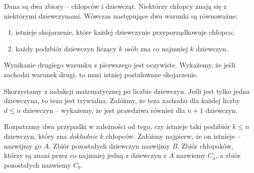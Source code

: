 \newpage


\noindent
Dana są dwa zbiory -- chłopców i dziewcząt. Niektórzy chłopcy znają się z niektórymi dziewczynami. Wówczas następujące dwa warunki są równoważne:
\begin{enumerate}
	\item istnieje skojarzenie, które każdej dziewczynie przyporządkowuje chłopca;
	\item każdy podzbiór dziewczyn liczący $k$ osób zna co najmniej $k$ dziewczyn.
\end{enumerate}



\vspace{5px}
\noindent
Wynikanie drugiego warunku z pierwszego jest oczywiste. Wykażemy, że jeśli zachodzi warunek drugi, to musi istniej postulowane skojarzenie.

\vspace{10px}
\noindent
Skorzystamy z indukcji matematycznej po liczbie dziewczyn. Jeśli jest tylko jedna dziewczyna, to teza jest trywialna. Załóżmy, że teza zachodzi dla każdej liczby $d \leqslant n$ dziewczyn -- wykażemy, że jest prawdziwa również dla $n + 1$ dziewczyn.

\vspace{10px}
\noindent
Rozpatrzmy dwa przypadki w zależności od tego, czy istnieje taki podzbiór $k \leqslant n$ dziewczyn, który zna \textit{dokładnie} $k$ chłopców. Załóżmy najpierw, że on istnieje -- nazwijmy go $A$. Zbiór pozostałych dziewczyn nazwijmy $B$. Zbiór chłopaków, którzy są znani przez co najmniej jedną z dziewczyn z $A$ nazwiemy $C_a$, a zbiór pozostałych nazwiemy $C_b$.

\begin{center}
\end{center}

